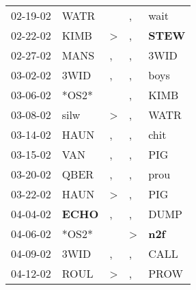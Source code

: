 \begin{supertabular}{p{0.07\textwidth}p{0.06\textwidth}p{0.02\textwidth}p{0.02\textwidth}p{0.06\textwidth}}
          02-19-02\textsuperscript{} &           WATR\textsuperscript{} &                  &                , &           wait\textsuperscript{} \\
          02-22-02\textsuperscript{} &           KIMB\textsuperscript{} &     \textgreater &                , &  \textbf{STEW\textsuperscript{}} \\
          02-27-02\textsuperscript{} &           MANS\textsuperscript{} &                , &                , &           3WID\textsuperscript{} \\
          03-02-02\textsuperscript{} &           3WID\textsuperscript{} &                , &                , &           boys\textsuperscript{} \\
          03-06-02\textsuperscript{} &                            *OS2* &                  &                , &           KIMB\textsuperscript{} \\
          03-08-02\textsuperscript{} &           silw\textsuperscript{} &     \textgreater &                , &           WATR\textsuperscript{} \\
          03-14-02\textsuperscript{} &           HAUN\textsuperscript{} &                , &                , &           chit\textsuperscript{} \\
          03-15-02\textsuperscript{} &            VAN\textsuperscript{} &                , &                , &            PIG\textsuperscript{} \\
          03-20-02\textsuperscript{} &           QBER\textsuperscript{} &                , &                , &           prou\textsuperscript{} \\
          03-22-02\textsuperscript{} &           HAUN\textsuperscript{} &     \textgreater &                , &            PIG\textsuperscript{} \\
          04-04-02\textsuperscript{} &  \textbf{ECHO\textsuperscript{}} &                , &                , &           DUMP\textsuperscript{} \\
          04-06-02\textsuperscript{} &                            *OS2* &                  &     \textgreater &   \textbf{n2f\textsuperscript{}} \\
          04-09-02\textsuperscript{} &           3WID\textsuperscript{} &                , &                , &           CALL\textsuperscript{} \\
          04-12-02\textsuperscript{} &           ROUL\textsuperscript{} &     \textgreater &                , &           PROW\textsuperscript{} \\

\end{supertabular}
